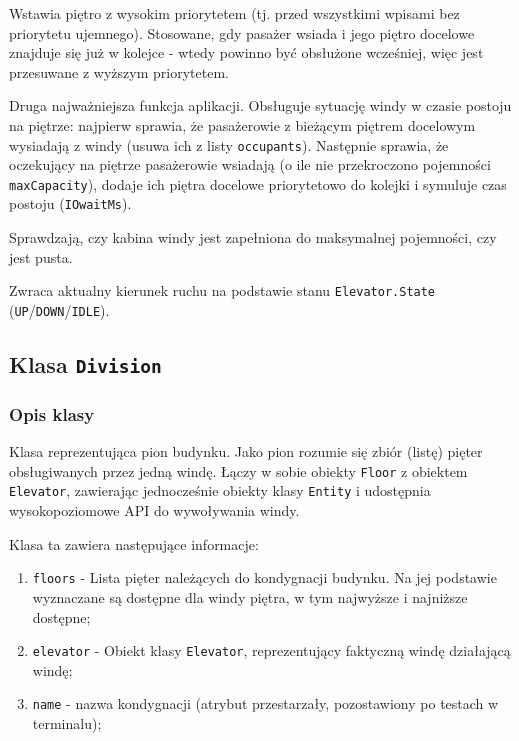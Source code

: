 \documentclass[12pt, a4paper]{article}
\begin{document}
\begin{description}[leftmargin=1cm, style=nextline]
  \item[\texttt{pushDestinationFront(int floor)}]
    Wstawia piętro z wysokim priorytetem (tj. przed wszystkimi wpisami bez priorytetu ujemnego).
    Stosowane, gdy pasażer wsiada i jego piętro docelowe znajduje się już w kolejce - wtedy powinno być obsłużone wcześniej, 
    więc jest przesuwane z wyższym priorytetem.


  \item[\texttt{handleFloorStop(Division division, int floorNum)}]
    Druga najważniejsza funkcja aplikacji. Obsługuje sytuację windy w czasie postoju na piętrze: najpierw sprawia, że pasażerowie
    z bieżącym piętrem docelowym wysiadają z windy (usuwa ich z listy \texttt{occupants}). Następnie sprawia, że oczekujący na piętrze
    pasażerowie wsiadają (o ile nie przekroczono pojemności \texttt{maxCapacity}), dodaje ich piętra docelowe priorytetowo do kolejki 
    i symuluje czas postoju (\texttt{IOwaitMs}).

  \item[\texttt{isFull()}, \texttt{isEmpty()}]
    Sprawdzają, czy kabina windy jest zapełniona do maksymalnej pojemności, czy jest pusta.

  \item[\texttt{getDirection()}]
    Zwraca aktualny kierunek ruchu na podstawie stanu \texttt{Elevator.State} (\texttt{UP}/\texttt{DOWN}/\texttt{IDLE}).
\end{description}






\subsection{Klasa \texttt{Division}}
\label{subsec:division}

\subsubsection{Opis klasy}

Klasa reprezentująca pion budynku. Jako pion rozumie się zbiór (listę) pięter obsługiwanych przez jedną windę. 
Łączy w sobie obiekty \texttt{Floor} z obiektem \texttt{Elevator}, zawierając jednocześnie obiekty klasy \texttt{Entity}
i udostępnia wysokopoziomowe API do wywoływania windy.

Klasa ta zawiera następujące informacje:
\begin{enumerate}
    \item \texttt{floors} - Lista pięter należących do kondygnacji budynku. Na jej podstawie wyznaczane są dostępne
        dla windy piętra, w tym najwyższe i najniższe dostępne; 

    \item \texttt{elevator} - Obiekt klasy \texttt{Elevator}, reprezentujący faktyczną windę działającą windę;
    \item \texttt{name} - nazwa kondygnacji (atrybut przestarzały, pozostawiony po testach w terminalu);  
\end{enumerate}
\end{document}

